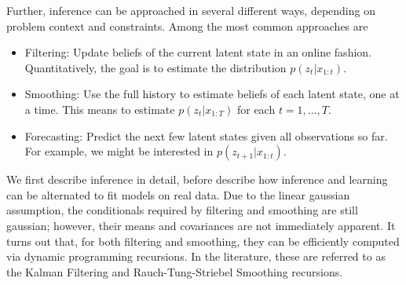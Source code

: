 \documentclass{article}
\begin{document}
Further, inference can be approached in several different ways, depending on
problem context and constraints. Among the most common approaches are

\begin{itemize}
\item Filtering: Update beliefs of the current latent state in an online
  fashion. Quantitatively, the goal is to estimate the distribution
  $p\left(z_{t} \vert x_{1:t}\right)$.
\item Smoothing: Use the full history to estimate beliefs of each latent state,
  one at a time. This means to estimate $p\left(z_{t} \vert x_{1:T}\right)$ for
  each $t = 1, \dots, T$.
\item Forecasting: Predict the next few latent states given all observations so
  far. For example, we might be interested in $p\left(z_{t + 1} \vert
  x_{1:t}\right)$.
\end{itemize}

\begin{figure}[ht]
  \centering
  \caption{\label{fig:lds_graphical} }
\end{figure}

We first describe inference in detail, before describe how inference and
learning can be alternated to fit models on real data. Due to the linear
gaussian assumption, the conditionals required by filtering and smoothing are
still gaussian; however, their means and covariances are not immediately
apparent. It turns out that, for both filtering and smoothing, they can be
efficiently computed via dynamic programming recursions. In the literature,
these are referred to as the Kalman Filtering and Rauch-Tung-Striebel Smoothing
recursions.
\end{document}
